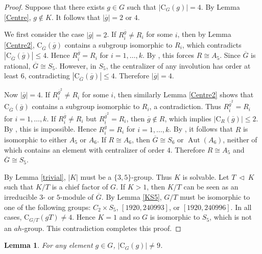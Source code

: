 \documentclass[11pt]{article}
\providecommand{\C}{{\mathrm{C}}}
\providecommand{\te}{{\ \triangleleft \ }}
\providecommand{\Aut}{{\operatorname{Aut}}}
\providecommand{\olg}{{\overline{g}}}
\providecommand{\olG}{{\overline{G}}}
\newtheorem{lem}{Lemma}
\begin{document}
\begin{proof}
    
    

    Suppose that there exists $g \in G$ such that $|\C_G(g)| = 4$.
    By Lemma \ref{Centre}, $g\notin K$.
    It follows that $|\olg|=2$ or $4$.
    
    We first consider the case $|\olg|=2$.
    If $R_i^{\olg}\neq R_i$ for some $i$, then by Lemma \ref{Centre2},
    $\C_{\olG}(\olg)$ contains a subgroup isomorphic to $R_i$,
    which contradicts $|\C_{\olG}(\olg)|\leq 4$.
    Hence $R_i^{\olg}=R_i$ for $i=1,\ldots,k$.
    By \cite[Code 1]{Git}, this forces $R\cong A_5$.
    Since $\olG$ is rational, $\olG\cong S_5$.
    However, in $S_5$, the centralizer of any involution has order at least $6$,
    contradicting $|\C_{\olG}(\olg)|\leq 4$.
    Therefore $|\olg|=4$.

    Now $|\olg|=4$.
    If $R_i^{\olg^2}\neq R_i$ for some $i$, then similarly Lemma \ref{Centre2}
    shows that $\C_{\olG}(\olg)$ contains a subgroup isomorphic to $R_i$,
    a contradiction.
    Thus $R_i^{\olg^2}=R_i$ for $i=1,\ldots,k$.
    If $R_i^{\olg}\neq R_i$ but $R_i^{\olg^2}=R_i$, then $\olg\notin R$,
    which implies $|\C_R(\olg)|\leq 2$.
    By \cite[Code 1]{Git}, this is impossible.
    Hence $R_i^{\olg}=R_i$ for $i=1,\ldots,k$.
    By \cite[Code 1]{Git}, it follows that $R$ is isomorphic to either
    $A_5$ or $A_6$.
    If $R\cong A_6$, then $\olG\cong S_6$ or $\Aut(A_6)$,
    neither of which contains an element with centralizer of order $4$.
    Therefore $R\cong A_5$ and $\olG\cong S_5$.

    By Lemma \ref{trivial}, $|K|$ must be a $\{3,5\}$-group.
    Thus $K$ is solvable.
    Let $T\te K$ such that $K/T$ is a chief factor of $G$.
    If $K>1$, then $K/T$ can be seen as an irreducible $3$- or $5$-module of $\olG$.
    By Lemma \ref{KS5}, $G/T$ must be isomorphic to one of the following groups:
    $C_2\times S_5$, $[1920, 240993]$, or $[1920, 240996]$.
    In all cases, $\C_{G/T}(gT)\neq 4$.
    Hence $K=1$ and so $G$ is isomorphic to $S_5$, which is not an $ah$-group.
    This contradiction completes this proof.
\end{proof}


\begin{lem}
    For any element $g \in G$, $|\C_G(g)| \neq 9$.
\end{lem} 
\end{document}
